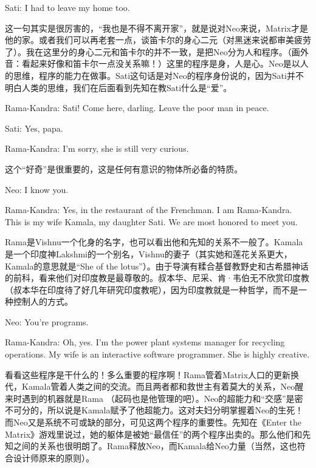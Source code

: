 \documentclass[UTF8]{ctexart}
\newenvironment{myquote}{\color{green} \setlength{\leftskip}{6em} \setlength{\rightskip}{4em} \setlength{\parindent}{-2em}}{\par}
\begin{document}
\begin{myquote}
Sati: I had to leave my home too.
\end{myquote}

这一句其实是很厉害的，“我也是不得不离开家”，就是说对Neo来说，Matrix才是他的家。或者我们可以再老套一点，谈笛卡尔的身心二元（对黑迷来说都审美疲劳了）。我在这里分的身心二元和笛卡尔的并不一致，是把Neo分为人和程序。（画外音：看起来好像和笛卡尔一点没关系嘛！）这里的程序是身，人是心。Neo是以人的思维，程序的能力在做事。Sati这句话是对Neo的程序身份说的，因为Sati并不明白人类的思维，我们在后面看到先知在教Sati什么是“爱”。

\begin{myquote}
Rama-Kandra: Sati! Come here, darling. Leave the poor man in peace.

Sati: Yes, papa.

Rama-Kandra: I'm sorry, she is still very curious.
\end{myquote}

这个“好奇”是很重要的，这是任何有意识的物体所必备的特质。

\begin{myquote}
Neo: I know you.

Rama-Kandra: Yes, in the restaurant of the Frenchman. I am Rama-Kandra. This is my wife Kamala, my daughter Sati. We are most honored to meet you.
\end{myquote}

Rama是Vishnu一个化身的名字，也可以看出他和先知的关系不一般了。Kamala是一个印度神Lakshmi的一个别名，Vishnu的妻子（其实她和莲花关系更大，Kamala的意思就是“She of the lotus”）。由于导演有糅合基督教野史和古希腊神话的前科，看来他们对印度教是最尊敬的。叔本华、尼采、肯·韦伯无不欣赏印度教（叔本华在印度待了好几年研究印度教呢），因为印度教就是一种哲学，而不是一种控制人的方式。

\begin{myquote}
Neo: You're programs.

Rama-Kandra: Oh, yes. I'm the power plant systems manager for recycling operations. My wife is an interactive software programmer. She is highly creative.
\end{myquote}

看看这些程序是干什么的！多么重要的程序啊！Rama管着Matrix人口的更新换代，Kamala管着人类之间的交流。而且两者都和救世主有着莫大的关系，Neo醒来时遇到的机器就是Rama （起码也是他管理的吧）。Neo的超能力和“交感”是密不可分的，所以说是Kamala赋予了他超能力。这对夫妇分明掌握着Neo的生死！而Neo又是系统不可或缺的部分，可见这两个程序的重要性。先知在《Enter the Matrix》游戏里说过，她的躯体是被她“最信任”的两个程序出卖的。那么他们和先知之间的关系也很明朗了。Rama释放Neo，而Kamala给Neo力量（当然，这也符合设计师原来的原则）。
\end{document}
